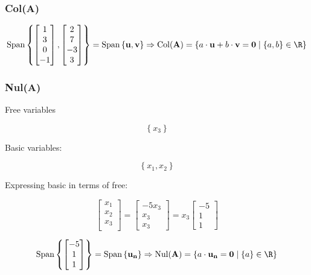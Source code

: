 \documentclass{article}
\begin{document}
\subsubsection{Col(\textbf{A})} 
\[%
    \text{Span} \left\{
    \begin{bmatrix} 1\\3\\0\\-1 \end{bmatrix},
    \begin{bmatrix} 2\\7\\-3\\3 \end{bmatrix}
    \right\}
    =
    \text{Span} \left\{ 
    \mathbf{u},\mathbf{v}\right\}
    \Rightarrow 
    \text{Col}(\mathbf{A}) = 
    \left\{  
    a \cdot \mathbf{u} +
    b \cdot \mathbf{v} 
    =
    \mathbf{0}
    \mid
    \left\{ a,b \right\} \in \R
    \right\}
\]%

\subsubsection{Nul(\textbf{A})} 
Free variables

\[%
    \left\{ x_3 \right\}
\]%


Basic variables:

\[%
    \left\{ x_1, x_2 \right\}
\]%


Expressing basic in terms of free:

\[%
    \begin{bmatrix} 
        x_1 \\
		x_2 \\
		x_3 \\
    \end{bmatrix}
    =
    \begin{bmatrix} -5 x_3 \\ x_3 \\ x_3 \end{bmatrix}
    =
    x_3
    \begin{bmatrix} -5\\1\\1 \end{bmatrix}
\]%


    
\[%
    \text{Span} \left\{  
    \begin{bmatrix} 
        -5\\1\\1
    \end{bmatrix}
    \right\}
    =
    \text{Span} \left\{ \mathbf{u_{n}}   \right\}
    \Rightarrow 
    \text{Nul}(\mathbf{A})
    =
    \left\{ 
    a \cdot\mathbf{u_{n}} = \mathbf{0}  \mid \left\{ a \right\}
    \in \R
    \right\}
\]%
\end{document}
